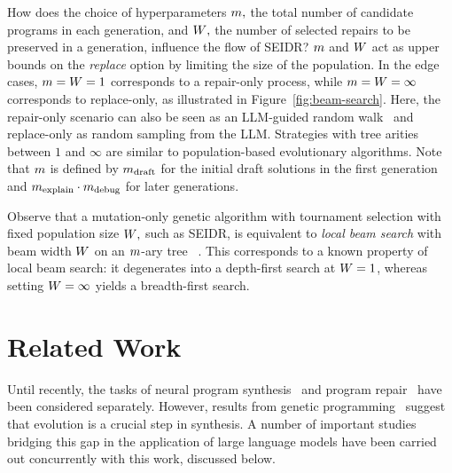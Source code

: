 How does the choice of hyperparameters $m{},$ the total number of candidate programs in each generation, and $W{},$ the number of selected repairs to be preserved in a generation, influence the flow of SEIDR?
$m$ and $W{}$ act as upper bounds on the \emph{replace} option by limiting the size of the population.
In the edge cases, $m{} = W{} = 1$ corresponds to a repair-only process, while $m{} = W{} = \infty$ corresponds to replace-only, as illustrated in Figure~\ref{fig:beam-search}. 
Here, the repair-only scenario can also be seen as an LLM-guided random walk~\cite{xia2020:random} and replace-only as random sampling from the LLM.
Strategies with tree arities between $1$ and $\infty$ are similar to population-based evolutionary algorithms.
Note that $m{}$ is defined by $m_\text{draft}$ for the initial draft solutions in the first generation and $m_\text{explain} \cdot m_\text{debug}$ for later generations. 

Observe that a mutation-only genetic algorithm with tournament selection with fixed population size $W{},$ such as SEIDR, is equivalent to \emph{local beam search} with beam width $W{}$ on an $m{}$-ary tree ~\cite[Section 4.1.4]{russell2010:artificial}. This corresponds to a known property of local beam search: it degenerates into a depth-first search at $W{} = 1$, whereas setting $W{} = \infty$ yields a breadth-first search.


\section{Related Work}
\label{sec:seidr-related-work}


Until recently, the tasks of neural program synthesis~\cite{gulwaniProgramSynthesis2017} and program repair~\cite{gouesAutomatedProgramRepair2019,petke2018:genetic,bugfixing,zhang2024systematic} have been considered separately.
However, results from genetic programming~\cite{sobaniaRecentDevelopmentsProgram2021} suggest that evolution is a crucial step in synthesis.
A number of important studies bridging this gap in the application of large language models have been carried out concurrently with this work, discussed below.

